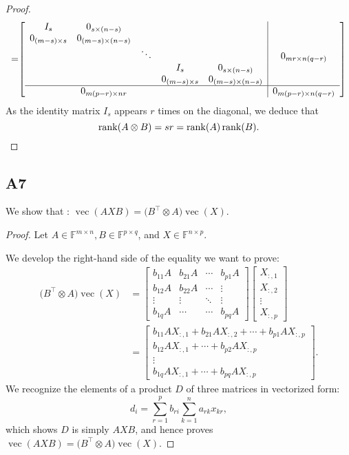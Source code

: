 \documentclass[11pt]{article}
\DeclareMathOperator{\rank}{rank}
\DeclareMathOperator{\vect}{vec}
\newcommand{\field}{\mathbb{F}} %
\newcommand{\kp}{\otimes} %
\begin{document}
\begin{proof}
\begin{align*}
    = &\mleft[\begin{array}{c c c c c|c}
    I_s & 0_{s \times (n-s)} & & & & \\
    0_{(m-s) \times s} & 0_{(m-s) \times (n-s)} & & & & \\
    & & \ddots &  & & 0_{mr \times n(q-r)} \\
    & & & I_s & 0_{s \times (n-s)} & \\
    & & & 0_{(m-s) \times s} & 0_{(m-s) \times (n-s)} & \\\hline
    & 0_{m(p-r) \times nr} & & & & 0_{m(p-r) \times n(q-r)} \\
    \end{array} \mright]\\
\end{align*}
As the identity matrix $I_s$ appears \(r\) times on the diagonal, we deduce that
\[
    \rank(A\kp B)=sr=\rank(A)\rank(B).\qedhere
\]
\end{proof}

\subsection*{A7}
We show that : $\vect(AXB)=\big(B^\top\kp A\big)\vect(X)$.
\begin{proof}
Let \(A \in \field^{m\times n}, B \in \field^{p\times q}\), and \(X \in \field^{n\times p}\).

We develop the right-hand side of the equality we want to prove:
\begin{align*}
    \big(B^\top\kp A\big)\vect(X) &=
    \begin{bmatrix}
    b_{11}A & b_{21}A & \cdots & b_{p1}A\\
    b_{12}A & b_{22}A & \cdots & \vdots \\
    \vdots & \vdots & \ddots & \vdots \\
    b_{1q}A & \cdots & \cdots & b_{pq}A
    \end{bmatrix}
    \begin{bmatrix}
    X_{:,1}\\
    X_{:,2}\\
    \vdots\\
    X_{:,p}
    \end{bmatrix}\\
    &=
    \begin{bmatrix}
    b_{11}AX_{:,1} + b_{21}AX_{:,2} + \cdots + b_{p1}AX_{:,p}\\
    b_{12}AX_{:,1} + \cdots + b_{p2}AX_{:,p}\\
    \vdots \\
    b_{1q}AX_{:,1} + \cdots + b_{pq}AX_{:,p}
    \end{bmatrix}.
\end{align*}
We recognize the elements of a product \(D\) of three matrices in vectorized form:
\[
    d_i=\sum^{p}_{r=1}b_{ri}\sum^{n}_{k=1}a_{rk}x_{kr},
\]
which shows \(D\) is simply \(AXB\), and hence proves \(\vect(AXB)=\big(B^\top\kp A\big)\vect(X)\).
\end{proof}
\end{document}
